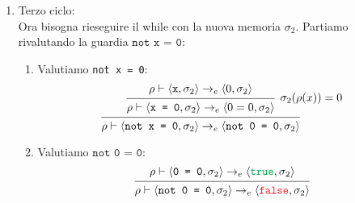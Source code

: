 \documentclass[a4paper]{article}
\begin{document}
\begin{example}
\begin{itemize}
\begin{enumerate}
\[\begin{prooftree}
              \hypo{ 
                \rho \vdash \left< \texttt{x - 1}, \sigma_1  \right> \to^*_e
                \left< 0, \sigma_1  \right>
              }
              \infer1{ 
                \rho \vdash \left< \texttt{x := x - 1}, \sigma_1  \right> \to_c
                \left< \texttt{x := 0}, \sigma_1  \right>
              }
            \end{prooftree}
          \] 
          L'esecuzione di \( \texttt{x := 0} \) restituisce una nuova memoria
          \( \sigma_2 \):
          \[
            \rho \vdash \left< \texttt{x := 0}, \sigma_1  \right> \to_c
            \sigma_1[l_x \mapsto 0] = \left[ l_x \mapsto 0 \right] = \sigma_2
          \] 

        \item Terzo ciclo:\\
          Ora bisogna rieseguire il while con la nuova memoria \( \sigma_2 \).
          Partiamo rivalutando la guardia \( \texttt{not x = 0} \):
          \begin{enumerate}
            \item Valutiamo \texttt{not x = 0}:
              \[
                \begin{prooftree}
                  \hypo{ 
                    \rho \vdash \left<\texttt{x}, \sigma_2 \right> \to_e
                    \left< 0, \sigma_2 \right>
                  }
                  \infer1[\( 
                    \sigma_2(\rho(x)) = 0
                  \)]{  
                    \rho \vdash \left< \texttt{x = 0}, \sigma_2 \right>
                    \to_e
                    \left< 0 = 0, \sigma_2 \right>
                  }
                  \infer1{ 
                    \rho \vdash \left<\texttt{not x = 0}, \sigma_2\right> 
                    \to_e
                    \left<\texttt{not 0 = 0},\sigma_2\right>
                  }
                \end{prooftree}
              \] 
            \item Valutiamo \( \texttt{not 0 = 0} \):
              \[
                \begin{prooftree}
                  \hypo{ 
                    \rho\vdash\left<\texttt{0 = 0},\sigma_2\right> 
                    \to_e
                    \left<\texttt{\textcolor{Green}{true}},\sigma_2\right>
                  }
                  \infer1{ 
                    \rho\vdash\left<\texttt{not 0 = 0},\sigma_2\right> 
                    \to_e
                    \left<\texttt{\textcolor{Red}{false}},\sigma_2\right>
                  }
                \end{prooftree}
\]
\end{enumerate}
\end{enumerate}
\end{itemize}
\end{example}
\end{document}
